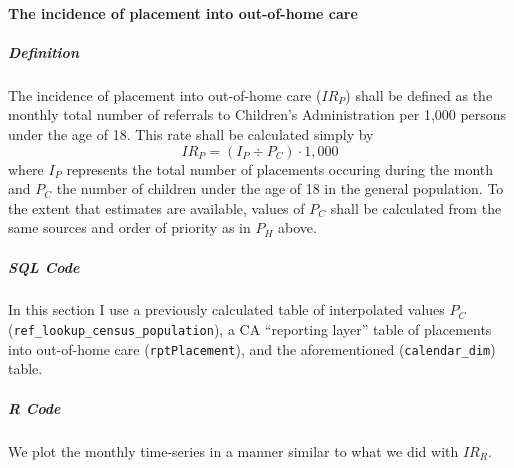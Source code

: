 \documentclass[12pt]{article}\usepackage[]{graphicx}\usepackage[]{color}
\begin{document}
\paragraph{The incidence of placement into out-of-home care}

\subparagraph{Definition} The incidence of placement into out-of-home care ($IR_P$) shall be defined as the monthly total number of referrals to Children's Administration per 1,000 persons under the age of 18. This rate shall be calculated simply by 
\begin{equation}\label{eq:IRP}
IR_P = (I_P \div P_C) \cdot 1,000
\end{equation}
where $I_P$ represents the total number of placements occuring during the month and $P_C$ the number of children under the age of 18 in the general population. To the extent that estimates are available, values of $P_C$ shall be calculated from the same sources and order of priority as in $P_H$ above.

\subparagraph{SQL Code}

In this section I use a previously calculated table of interpolated values $P_C$ (\texttt{ref\_lookup\_census\_population}), a CA ``reporting layer'' table of placements into out-of-home care (\texttt{rptPlacement}), and the aforementioned (\texttt{calendar\_dim}) table.




\subparagraph{R Code}

We plot the monthly time-series in a manner similar to what we did with $IR_R$.  
\end{document}
